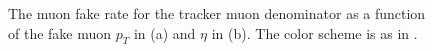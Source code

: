 \documentclass{cmspaper}
\begin{document}
\begin{figure}[htb]
  \begin{center}
    
    \caption{The muon fake rate for the tracker muon denominator as a function of the fake muon $p_T$ in (a) and $\eta$ in (b). The color  scheme is as in .}
    \label{fig:muonFakeRate_TrackerMuon}
  \end{center}
\end{figure}
\end{document}
